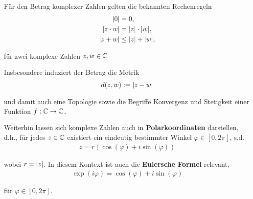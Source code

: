 \par
Für den Betrag komplexer Zahlen gelten die bekannten Rechenregeln
\begin{align*}
\vert 0 \vert&=0,\\
\vert z\cdot w \vert &= \vert z \vert\cdot \vert w \vert,\\
\vert z+w \vert&\leq\vert z \vert+\vert w \vert,
\end{align*}
\par
für zwei komplexe Zahlen \(z,w\in\mathbb{C}\)

\par
Insbesondere induziert der Betrag die Metrik
\begin{align*}
d(z,w):= \vert z-w \vert
\end{align*}
\par
und damit auch eine Topologie sowie die Begriffe Konvergenz und Stetigkeit einer Funktion \(f:\mathbb{C}\to\mathbb{C}\).

\par
Weiterhin lassen sich komplexe Zahlen auch in \textbf{Polarkoordinaten} darstellen, d.h., für jedes \(z\in\mathbb{C}\) existiert ein eindeutig bestimmter Winkel \(\varphi\in [0,2\pi]\), s.d.
\begin{align*}
z = r(\cos(\varphi) + i\sin(\varphi))
\end{align*}
\par
wobei \(r=\vert z \vert\). In diesem Kontext ist auch die \textbf{Eulersche Formel} relevant,
\begin{align}\label{equation:complexanalysis/complexnumbers:eq:euler}
\exp(i\varphi) = \cos(\varphi) + i\sin(\varphi)
\end{align}
\par
für \(\varphi\in [0,2\pi]\).


